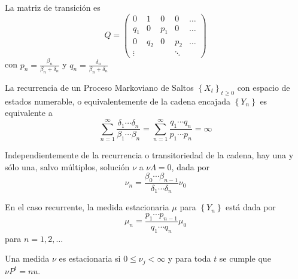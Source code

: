 La matriz de transici\'on es
\begin{equation}
Q=\left(\begin{array}{ccccc}
0& 1 & 0 & 0 & \ldots\\
q_{1}&0 & p_{1}&0&\ldots\\
0&q_{2}&0& p_{2}&\ldots\\
\vdots & & & \ddots &
\end{array}\right)
\end{equation}
con $p_{n}=\frac{\beta_{n}}{\beta_{n}+\delta_{n}}$ y
$q_{n}=\frac{\delta_{n}}{\beta_{n}+\delta_{n}}$
\begin{Prop}
La recurrencia de un Proceso Markoviano de Saltos
$\left\{X_{t}\right\}_{t\geq0}$ con espacio de estados numerable,
o equivalentemente de la cadena encajada $\left\{Y_{n}\right\}$ es
equivalente a
\begin{equation}\label{Eq.2.1}
\sum_{n=1}^{\infty}\frac{\delta_{1}\cdots\delta_{n}}{\beta_{1}\cdots\beta_{n}}=\sum_{n=1}^{\infty}\frac{q_{1}\cdots
q_{n}}{p_{1}\cdots p_{n}}=\infty
\end{equation}
\end{Prop}

\begin{Lem}
Independientemente de la recurrencia o transitoriedad de la
cadena, hay una y s\'olo una, salvo m\'ultiplos, soluci\'on $\nu$
a $\nu\Lambda=0$, dada por
\begin{equation}\label{Eq.2.2}
\nu_{n}=\frac{\beta_{0}\cdots\beta_{n-1}}{\delta_{1}\cdots\delta_{n}}\nu_{0}
\end{equation}
\end{Lem}

\begin{Col}\label{Corolario2.3}
En el caso recurrente, la medida estacionaria $\mu$ para
$\left\{Y_{n}\right\}$ est\'a dada por
\begin{equation}\label{Eq.2.3}
\mu_{n}=\frac{p_{1}\cdots p_{n-1}}{q_{1}\cdots q_{n}}\mu_{0}
\end{equation}
para $n=1,2,\ldots$
\end{Col}

\begin{Def}
Una medida $\nu$ es estacionaria si $0\leq\nu_{j}<\infty$ y para
toda $t$ se cumple que $\nu P^{t}=nu$.
\end{Def}


